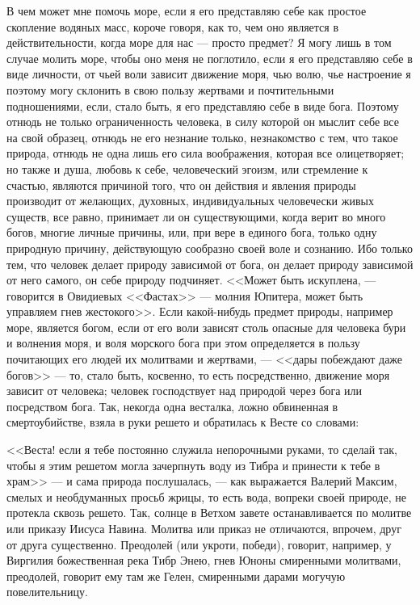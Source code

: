 \documentclass[12pt]{article}
\begin{document}
В чем может мне помочь море, если я его представляю себе как простое скопление водяных масс, короче говоря, как то, чем оно является в действительности, когда море для нас --- просто предмет? Я могу лишь в том случае молить море, чтобы оно меня не поглотило, если я его представляю себе в виде личности, от чьей воли зависит движение моря, чью волю, чье настроение я поэтому могу склонить в свою пользу жертвами и почтительными подношениями, если, стало быть, я его представляю себе в виде бога. Поэтому отнюдь не только ограниченность человека, в силу которой он мыслит себе все на свой образец, отнюдь не его незнание только, незнакомство с тем, что такое природа, отнюдь не одна лишь его сила воображения, которая все олицетворяет; но также и душа, любовь к себе, человеческий эгоизм, или стремление к счастью, являются причиной того, что он действия и явления природы производит от желающих, духовных, индивидуальных человечески живых существ, все равно, принимает ли он существующими, когда верит во много богов, многие личные причины, или, при вере в единого бога, только одну природную причину, действующую сообразно своей воле и сознанию. Ибо только тем, что человек делает природу зависимой от бога, он делает природу зависимой от него самого, он себе природу подчиняет. <<Может быть искуплена, --- говорится в Овидиевых <<Фастах>>  --- молния Юпитера, может быть управляем гнев жестокого>>. Если какой-нибудь предмет природы, например море, является богом, если от его воли зависят столь опасные для человека бури и волнения моря, и воля морского бога при этом определяется в пользу почитающих его людей их молитвами и жертвами, --- <<дары побеждают даже богов>>  --- то, стало быть, косвенно, то есть посредственно, движение моря зависит от человека; человек господствует над природой через бога или посредством бога. Так, некогда одна весталка, ложно обвиненная в смертоубийстве, взяла в руки решето и обратилась к Весте со словами: 

<<Веста! если я тебе постоянно служила непорочными руками, то сделай так, чтобы я этим решетом могла зачерпнуть воду из Тибра и принести к тебе в храм>>  --- и сама природа послушалась, --- как выражается Валерий Максим, смелых и необдуманных просьб жрицы, то есть вода, вопреки своей природе, не протекла сквозь решето. Так, солнце в Ветхом завете останавливается по молитве или приказу Иисуса Навина. Молитва или приказ не отличаются, впрочем, друг от друга существенно. Преодолей (или укроти, победи), говорит, например, у Виргилия божественная река Тибр Энею, гнев Юноны смиренными молитвами, преодолей, говорит ему там же Гелен, смиренными дарами могучую повелительницу. 
\end{document}
